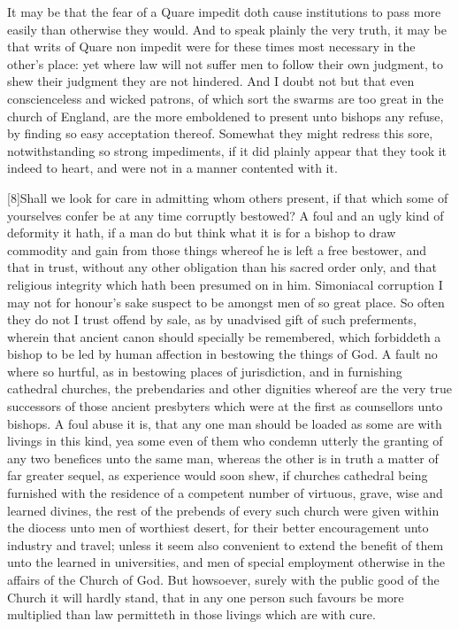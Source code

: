 It may be that the fear of a Quare impedit doth cause institutions to pass more easily than otherwise they would.  And to speak plainly the very truth, it may be that writs of Quare non impedit were for these times most necessary in the other’s place: yet where law will not suffer men to follow their own judgment, to shew their judgment they are not hindered. And I doubt not but that even conscienceless and wicked patrons, of which sort the swarms are too great in the church of England, are the more emboldened to present unto bishops any refuse, by finding so easy acceptation thereof. Somewhat they might redress this sore, notwithstanding so strong impediments, if it did plainly appear that they took it indeed to heart, and were not in a manner contented with it.

[8]Shall we look for care in admitting whom others present, if that which some of yourselves confer be at any time corruptly bestowed? A foul and an ugly kind of deformity it hath, if a man do but think what it is for a bishop to draw commodity and gain from those things whereof he is left a free bestower, and that in trust, without any other obligation than his sacred order only, and that religious integrity which hath been presumed on in him. Simoniacal corruption I may not for honour’s sake suspect to be amongst men of so great place. So often they do not I trust offend by sale, as by unadvised gift of such preferments, wherein that ancient canon should specially be remembered, which forbiddeth a bishop to be led by human affection in bestowing the things of God. A fault no where so hurtful, as in bestowing places of jurisdiction, and in furnishing cathedral churches, the prebendaries and other dignities whereof are the very true successors of those ancient presbyters which  were at the first as counsellors unto bishops. A foul abuse it is, that any one man should be loaded as some are with livings in this kind, yea some even of them who condemn utterly the granting of any two benefices unto the same man, whereas the other is in truth a matter of far greater sequel, as experience would soon shew, if churches cathedral being furnished with the residence of a competent number of virtuous, grave, wise and learned divines, the rest of the prebends of every such church were given within the diocess unto men of worthiest desert, for their better encouragement unto industry and travel; unless it seem also convenient to extend the benefit of them unto the learned in universities, and men of special employment otherwise in the affairs of the Church of God. But howsoever, surely with the public good of the Church it will hardly stand, that in any one person such favours be more multiplied than law permitteth in those livings which are with cure.

